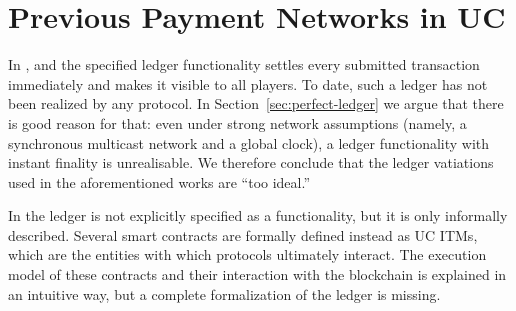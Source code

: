 \section{Previous Payment Networks in UC}
\label{sec:related-work}
  In \cite{DBLP:conf/ccs/DziembowskiFH18}, \cite{perun} and
  \cite{Malavolta:2017:CPP:3133956.3134096} the specified ledger functionality
  settles every submitted transaction immediately and makes it visible to all
  players. To date, such a ledger has not been realized by any protocol. In
  Section~\ref{sec:perfect-ledger} we argue that there is good reason for
  that: even under strong network assumptions (namely, a synchronous multicast
  network and a global clock), a ledger functionality with instant finality is
  unrealisable. We therefore conclude that the ledger vatiations used in the
  aforementioned works are ``too ideal.''

  In \cite{sprites} the ledger is not explicitly specified as a functionality,
  but it is only informally described. Several smart contracts are formally
  defined instead as UC ITMs, which are the entities with which protocols
  ultimately interact. The execution model of these contracts and their
  interaction with the blockchain is explained in an intuitive way, but a
  complete formalization of the ledger is missing.
